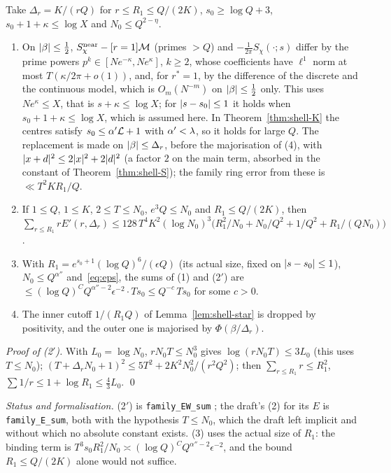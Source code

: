 \begin{lemma}\label{lem:shell-5c}
Take $\Delta_r=K/(rQ)$ for $r\le R_1\le Q/(2K)$, $s_0\ge\log Q+3$, $s_0+1+\kappa\le\log X$ and $N_0\le Q^{2-\eta}$.
\begin{enumerate}[label=(\arabic*)]
\item On $\lvert \beta\rvert\le\frac12$, $S^{\rm near}_\chi-[r=1]\mathcal M$ (primes $>Q$) and $-\frac1{2\pi}S_\chi(\cdot;s)$ differ by the prime powers $p^k\in[Ne^{-\kappa},Ne^\kappa]$, $k\ge2$,
whose coefficients have $\ell^1$ norm at most $T(\kappa/2\pi+o(1))$, and, for $r^*=1$, by the difference of the discrete and the continuous model, which is
$O_m(N^{-m})$ on $\lvert \beta\rvert\le\frac12$ only. This uses $Ne^\kappa\le X$, that is $s+\kappa\le\log X$; for $\lvert s-s_0\rvert\le1$ it holds when $s_0+1+\kappa\le\log X$, which is assumed
here. In Theorem~\ref{thm:shell-K} the centres satisfy $s_0\le\alpha'\mathcal L+1$ with $\alpha'<\lambda$, so it holds for large $Q$. The replacement
is made on $\lvert \beta\rvert\le\Delta_r$, before the majorisation of (4), with $\lvert x+d\rvert^2\le2\lvert x\rvert^2+2\lvert d\rvert^2$ (a factor $2$ on the main term, absorbed in the
constant of Theorem~\ref{thm:shell-S}); the family ring error from these is $\ll T^2KR_1/Q$.
\item[(2$'$)] If $1\le Q$, $1\le K$, $2\le T\le N_0$, $e^3Q\le N_0$ and $R_1\le Q/(2K)$, then
$\sum_{r\le R_1}rE'(r,\Delta_r)\le128\,T^4K^2(\log N_0)^3\bigl(R_1^2/N_0+N_0/Q^2+1/Q^2+R_1/(QN_0)\bigr)$.
\item[(3)] With $R_1=e^{s_0+1}(\log Q)^6/(\epsilon Q)$ (its actual size, fixed on $\lvert s-s_0\rvert\le1$), $N_0\le Q^{\alpha''}$ and~\eqref{eq:eps}, the sums of (1) and
(2$'$) are $\le(\log Q)^{C}Q^{\alpha''-2}\epsilon^{-2}\cdot Ts_0\le Q^{-c}\,Ts_0$ for some $c>0$.
\item[(4)] The inner cutoff $1/(R_1Q)$ of Lemma~\ref{lem:shell-star} is dropped by positivity, and the outer one is majorised by $\Phi(\beta/\Delta_r)$.
\end{enumerate}
\end{lemma}
\emph{Proof of (2$'$).} With $L_0=\log N_0$, $rN_0T\le N_0^3$ gives $\log(rN_0T)\le3L_0$ (this uses $T\le N_0$); $(T+\Delta_rN_0+1)^2\le5T^2+2K^2N_0^2/(r^2Q^2)$;
then $\sum_{r\le R_1}r\le R_1^2$, $\sum1/r\le1+\log R_1\le\frac43L_0$. \qed

\emph{Status and formalisation.} (2$'$) is \texttt{family\_EW\_sum} \tagL; the draft's (2) for its $E$ is \texttt{family\_E\_sum},
both with the hypothesis $T\le N_0$, which the draft left implicit and without which no absolute constant exists. (3) uses the actual size of $R_1$: the
binding term is $T^3s_0R_1^2/N_0\asymp(\log Q)^CQ^{\alpha''-2}\epsilon^{-2}$, and the bound $R_1\le Q/(2K)$ alone would not suffice.

